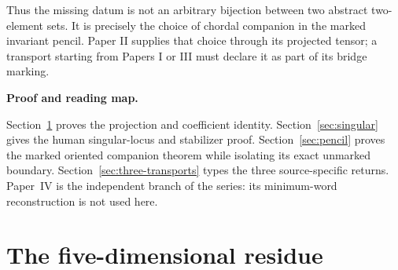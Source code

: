 \documentclass[11pt]{article}
\theoremstyle{definition}
\theoremstyle{remark}
\begin{document}
Thus the missing datum is not an arbitrary bijection between two abstract
two-element sets.  It is precisely the choice of chordal companion in the
marked invariant pencil.  Paper II supplies that choice through its projected
tensor; a transport starting from Papers I or III must declare it as part of
its bridge marking.

\medskip
\noindent\textbf{Proof and reading map.}
\begin{center}
\footnotesize
{}
\end{center}

Section~\ref{sec:projection} proves the projection and coefficient identity.
Section~\ref{sec:singular} gives the human singular-locus and stabilizer
proof.  Section~\ref{sec:pencil} proves the marked oriented companion
theorem while isolating its exact unmarked boundary.
Section~\ref{sec:three-transports} types the three source-specific returns.
Paper~IV is the independent branch of the series: its minimum-word
reconstruction is not used here.

\section{The five-dimensional residue}
\label{sec:projection}
\end{document}
